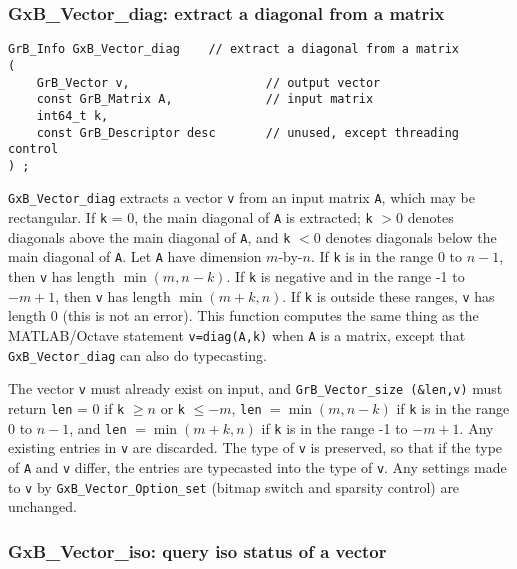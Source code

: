 \documentclass[12pt]{article}
\begin{document}
\subsubsection{{\sf GxB\_Vector\_diag:} extract a diagonal from a matrix}
\label{vector_diag}

\begin{mdframed}[userdefinedwidth=6in]
{\footnotesize
\begin{verbatim}
GrB_Info GxB_Vector_diag    // extract a diagonal from a matrix
(
    GrB_Vector v,                   // output vector
    const GrB_Matrix A,             // input matrix
    int64_t k,
    const GrB_Descriptor desc       // unused, except threading control
) ;
\end{verbatim} } \end{mdframed}


\verb'GxB_Vector_diag' extracts a vector \verb'v' from an input matrix
\verb'A', which may be rectangular.  If \verb'k' = 0, the main diagonal of
\verb'A' is extracted; \verb'k' $> 0$ denotes diagonals above the main diagonal
of \verb'A', and \verb'k' $< 0$ denotes diagonals below the main diagonal of
\verb'A'.  Let \verb'A' have dimension $m$-by-$n$.  If \verb'k' is in the range
0 to $n-1$, then \verb'v' has length $\min(m,n-k)$.  If \verb'k' is negative
and in the range -1 to $-m+1$, then \verb'v' has length $\min(m+k,n)$.  If
\verb'k' is outside these ranges, \verb'v' has length 0 (this is not an error).
This function computes the same thing as the MATLAB/Octave statement
\verb'v=diag(A,k)' when \verb'A' is a matrix, except that
\verb'GxB_Vector_diag' can also do typecasting.

The vector \verb'v' must already exist on input, and
\verb'GrB_Vector_size (&len,v)' must return \verb'len' = 0 if \verb'k' $\ge n$
or \verb'k' $\le -m$, \verb'len' $=\min(m,n-k)$ if \verb'k' is in the range 0
to $n-1$, and \verb'len' $=\min(m+k,n)$ if \verb'k' is in the range -1 to
$-m+1$.  Any existing entries in \verb'v' are discarded.  The type of \verb'v'
is preserved, so that if the type of \verb'A' and \verb'v' differ, the entries
are typecasted into the type of \verb'v'.  Any settings made to \verb'v' by
\verb'GxB_Vector_Option_set' (bitmap switch and sparsity control) are
unchanged.

\newpage
\subsubsection{{\sf GxB\_Vector\_iso:} query iso status of a vector}
\label{vector_iso}
\end{document}
